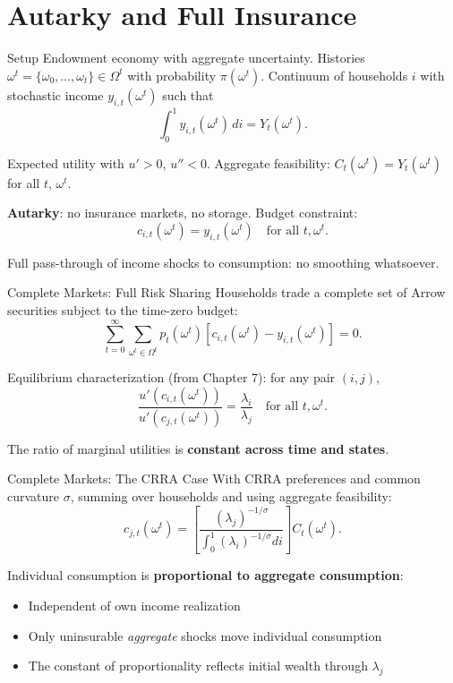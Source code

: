 \documentclass[blue]{beamer}
\begin{document}
	\section{Autarky and Full Insurance}
	
	\begin{frame}{Setup}
		Endowment economy with aggregate uncertainty. Histories $\omega^t = \{\omega_0, \ldots, \omega_t\} \in \Omega^t$ with probability $\pi(\omega^t)$. Continuum of households $i$ with stochastic income $y_{i,t}(\omega^t)$ such that
		\[
		\int_0^1 y_{i,t}(\omega^t) \, di = Y_t(\omega^t).
		\]
		
		Expected utility with $u' > 0$, $u'' < 0$. Aggregate feasibility: $C_t(\omega^t) = Y_t(\omega^t)$ for all $t$, $\omega^t$.
		
		\bigskip
		\textbf{Autarky}: no insurance markets, no storage. Budget constraint:
		\[
		c_{i,t}(\omega^t) = y_{i,t}(\omega^t) \quad \text{for all } t, \omega^t.
		\]
		
		Full pass-through of income shocks to consumption: no smoothing whatsoever.
	\end{frame}
	
	\begin{frame}{Complete Markets: Full Risk Sharing}
		Households trade a complete set of Arrow securities subject to the time-zero budget:
		\[
		\sum_{t=0}^{\infty} \sum_{\omega^t \in \Omega^t} p_t(\omega^t)\left[c_{i,t}(\omega^t) - y_{i,t}(\omega^t)\right] = 0.
		\]
		
		Equilibrium characterization (from Chapter 7): for any pair $(i,j)$,
		\[
		\frac{u'(c_{i,t}(\omega^t))}{u'(c_{j,t}(\omega^t))} = \frac{\lambda_i}{\lambda_j} \quad \text{for all } t, \omega^t.
		\]
		
		The ratio of marginal utilities is \textbf{constant across time and states}.
	\end{frame}
	
	\begin{frame}{Complete Markets: The CRRA Case}
		With CRRA preferences and common curvature $\sigma$, summing over households and using aggregate feasibility:
		\[
		c_{j,t}(\omega^t) = \left[\frac{(\lambda_j)^{-1/\sigma}}{\int_0^1 (\lambda_i)^{-1/\sigma} di}\right] C_t(\omega^t).
		\]
		
		\bigskip
		Individual consumption is \textbf{proportional to aggregate consumption}:
		\begin{itemize}
			\item Independent of own income realization
			\item Only uninsurable \emph{aggregate} shocks move individual consumption
			\item The constant of proportionality reflects initial wealth through $\lambda_j$
		\end{itemize}
	\end{frame}
	
\end{document}
